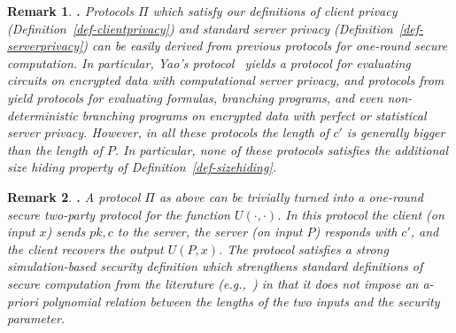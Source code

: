 \documentclass[11pt]{article}
\newcommand{\full}[1]{#1}
\newtheorem{REMARK}{Remark}[section]
\newenvironment{remark}{\begin{REMARK} \hspace{-.85em} {\bf .} \rm}%
	{\end{REMARK}}
\begin{document}
\begin{remark}
Protocols $\Pi$ which satisfy our definitions of client privacy
(Definition~\ref{def-clientprivacy}) and standard server privacy
(Definition~\ref{def-serverprivacy}) can be easily derived from
previous protocols for one-round secure computation. In particular,
Yao's protocol~\cite{yao86}
yields a protocol for evaluating circuits on encrypted data with
computational server privacy, and protocols
from~\cite{syy99,K,FKN94,ik00,beaver00,Rap,Kol} yield protocols for
evaluating formulas, branching programs, and even non-deterministic
branching programs on encrypted data with perfect or statistical
server privacy. However, in all these protocols the length of $c'$
is generally bigger than the length of $P$. In particular, none of
these protocols satisfies the additional size hiding property of
Definition~\ref{def-sizehiding}.
\end{remark}

\full{
\begin{remark}
A protocol $\Pi$ as above can be trivially turned into a one-round
secure two-party protocol for the function $U(\cdot,\cdot)$. In
this protocol the client (on input $x$) sends $pk,c$ to the server,
the server (on input $P$) responds with $c'$, and the client
recovers the output $U(P,x)$. The protocol satisfies a strong
simulation-based security definition which strengthens standard
definitions of secure computation from the literature
(e.g.,~\cite{canetti01,Goldbook}) in that it does not impose an a-priori
polynomial relation between the lengths of the two inputs and the
security parameter.
\end{remark}
}

\end{document}

